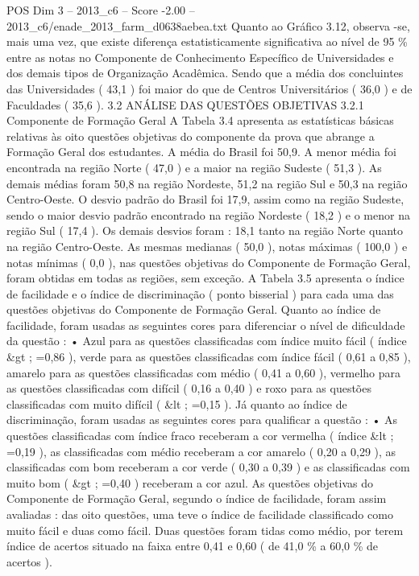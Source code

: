 \begin{textsample}{POS Dim 3 – 2013\_c6 – Score -2.00 – 2013\_c6/enade\_2013\_farm\_d0638aebea.txt}
Quanto ao Gráfico 3.12, observa -se, mais uma vez, que existe diferença estatisticamente significativa ao nível de 95 \% entre as notas no Componente de Conhecimento Específico de Universidades e dos demais tipos de Organização Acadêmica.
Sendo que a média dos concluintes das Universidades ( 43,1 ) foi maior do que de Centros Universitários ( 36,0 ) e de Faculdades ( 35,6 ). 3.2 ANÁLISE DAS QUESTÕES OBJETIVAS 3.2.1 Componente de Formação Geral A Tabela 3.4 apresenta as estatísticas básicas relativas às oito questões objetivas do componente da prova que abrange a Formação Geral dos estudantes.
A média do Brasil foi 50,9.
A menor média foi encontrada na região Norte ( 47,0 ) e a maior na região Sudeste ( 51,3 ).
As demais médias foram 50,8 na região Nordeste, 51,2 na região Sul e 50,3 na região Centro-Oeste.
O desvio padrão do Brasil foi 17,9, assim como na região Sudeste, sendo o maior desvio padrão encontrado na região Nordeste ( 18,2 ) e o menor na região Sul ( 17,4 ).
Os demais desvios foram : 18,1 tanto na região Norte quanto na região Centro-Oeste.
As mesmas medianas ( 50,0 ), notas máximas ( 100,0 ) e notas mínimas ( 0,0 ), nas questões objetivas do Componente de Formação Geral, foram obtidas em todas as regiões, sem exceção.
A Tabela 3.5 apresenta o índice de facilidade e o índice de discriminação ( ponto bisserial ) para cada uma das questões objetivas do Componente de Formação Geral.
Quanto ao índice de facilidade, foram usadas as seguintes cores para diferenciar o nível de dificuldade da questão : • Azul para as questões classificadas com índice muito fácil ( índice \&gt ; =0,86 ), verde para as questões classificadas com índice fácil ( 0,61 a 0,85 ), amarelo para as questões classificadas com médio ( 0,41 a 0,60 ), vermelho para as questões classificadas com difícil ( 0,16 a 0,40 ) e roxo para as questões classificadas com muito difícil ( \&lt ; =0,15 ).
Já quanto ao índice de discriminação, foram usadas as seguintes cores para qualificar a questão : • As questões classificadas com índice fraco receberam a cor vermelha ( índice \&lt ; =0,19 ), as classificadas com médio receberam a cor amarelo ( 0,20 a 0,29 ), as classificadas com bom receberam a cor verde ( 0,30 a 0,39 ) e as classificadas com muito bom ( \&gt ; =0,40 ) receberam a cor azul.
As questões objetivas do Componente de Formação Geral, segundo o índice de facilidade, foram assim avaliadas : das oito questões, uma teve o índice de facilidade classificado como muito fácil e duas como fácil.
Duas questões foram tidas como médio, por terem índice de acertos situado na faixa entre 0,41 e 0,60 ( de 41,0 \% a 60,0 \% de acertos ).

\end{textsample}
